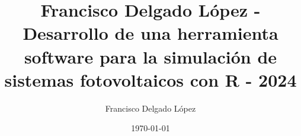 \documentclass[oldfontcommands, a4paper, 11pt]{memoir}
\author{Francisco Delgado López}
\date{\today}
\title{Francisco Delgado López - Desarrollo de una herramienta software para la simulación de sistemas fotovoltaicos con R - 2024}
\begin{document}
\frontmatter






\cleardoublepage

\tableofcontents
\cleardoublepage

\listoffigures
\cleardoublepage

\listoftables

\printnomenclature{}
\cleardoublepage


\mainmatter













\cleardoublepage

\printbibliography

\appendix


\end{document}

